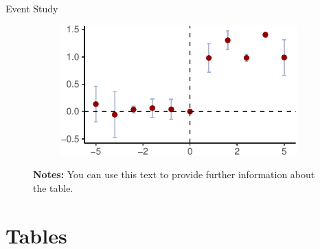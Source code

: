 \documentclass[11pt, aspectratio=169, t]{beamer}
\begin{document}
\begin{frame}{Event Study}
\protect\hypertarget{event-study}{}
\begin{figure}

\caption{\label{fig-eventstudy}Coefficients relative to treatment time}

{\centering 

\begin{figure}[H]

{\centering \includegraphics{example_slides_files/figure-beamer/eventstudy-1.pdf}

}

\end{figure}

\hypertarget{fig-eventstudy-1}{}
\vspace{-10pt}
\begin{minipage}{0.9\textwidth}
\scriptsize
\singlespacing
\textbf{Notes:} You can use this text to provide further information about the table. \lipsum[66]
\end{minipage}
\vspace{15pt}

}

\end{figure}
\end{frame}

\hypertarget{tables}{%
\section{Tables}\label{tables}}
\end{document}
